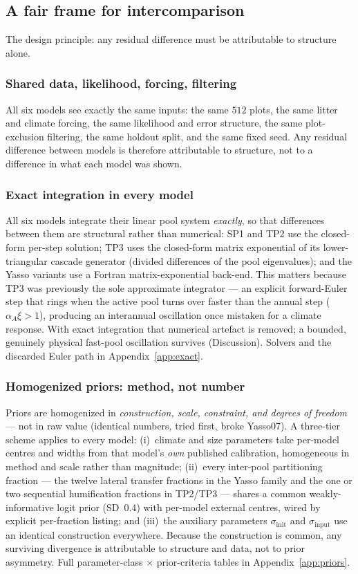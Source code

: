 \documentclass[11pt]{article}
\begin{document}
\subsection{A fair frame for intercomparison}
The design principle: any residual difference must be attributable to
structure alone.

\subsubsection{Shared data, likelihood, forcing, filtering}
All six models see exactly the same inputs: the same $512$ plots, the same
litter and climate forcing, the same likelihood and error structure, the same
plot-exclusion filtering, the same holdout split, and the same fixed seed. Any
residual difference between models is therefore attributable to structure, not
to a difference in what each model was shown.

\subsubsection{Exact integration in every model}
All six models integrate their linear pool system \emph{exactly}, so that
differences between them are structural rather than numerical: SP1 and TP2 use
the closed-form per-step solution; TP3 uses the closed-form matrix exponential
of its lower-triangular cascade generator (divided differences of the pool
eigenvalues); and the Yasso variants use a Fortran matrix-exponential
back-end. This matters because TP3 was previously the sole approximate
integrator --- an explicit forward-Euler step that rings when the active pool
turns over faster than the annual step ($\alpha_A\xi>1$), producing an
interannual oscillation once mistaken for a climate response. With exact
integration that numerical artefact is removed; a bounded, genuinely physical
fast-pool oscillation survives (Discussion). Solvers and the discarded Euler
path in Appendix~\ref{app:exact}.

\subsubsection{Homogenized priors: method, not number}
Priors are homogenized in \emph{construction, scale, constraint, and degrees of
freedom} --- not in raw value (identical numbers, tried first, broke Yasso07).
A three-tier scheme applies to every model: (i)~climate and size parameters take
per-model centres and widths from that model's \emph{own} published calibration,
homogeneous in method and scale rather than magnitude; (ii)~every inter-pool
partitioning fraction --- the twelve lateral transfer fractions in the Yasso
family and the one or two sequential humification fractions in TP2/TP3 --- shares
a common weakly-informative logit prior (SD~$0.4$) with per-model external
centres, wired by explicit per-fraction listing; and (iii)~the auxiliary
parameters $\sigma_{\mathrm{init}}$ and
$\sigma_{\mathrm{input}}$ use an identical construction everywhere. Because the
construction is common, any surviving divergence is attributable to structure
and data, not to prior asymmetry. Full parameter-class $\times$ prior-criteria
tables in Appendix~\ref{app:priors}.
\end{document}
